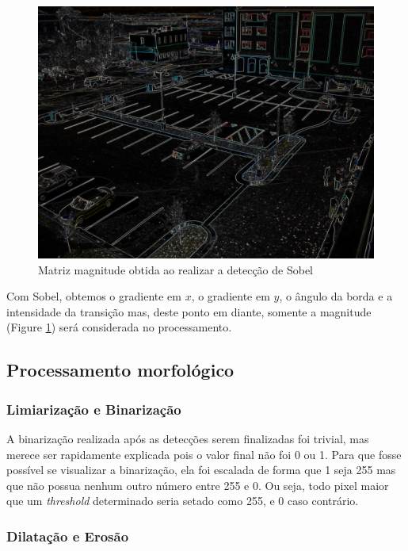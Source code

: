\documentclass[10pt,twocolumn,letterpaper]{article}
\begin{document}
\begin{figure}[!hbp]
\centering
\includegraphics[width=\columnwidth]{sobel-mag.jpg}
\caption{Matriz magnitude obtida ao realizar a detecção de Sobel}
\label{fig:sobel}
\end{figure}

	Com Sobel, obtemos o gradiente em $x$, o gradiente em $y$, o ângulo da borda e a
intensidade da transição mas, deste ponto em diante, somente a magnitude (Figure \ref{fig:sobel}) será considerada
no processamento.

\subsection{Processamento morfológico}

\subsubsection{Limiarização e Binarização}

	A binarização realizada após as detecções serem finalizadas foi trivial, mas merece
ser rapidamente explicada pois o valor final não foi 0 ou 1. Para que fosse possível se
visualizar a binarização, ela foi escalada de forma que 1 seja 255 mas que não possua
nenhum outro número entre 255 e 0. Ou seja, todo pixel maior que um \emph{threshold}
determinado seria setado como 255, e 0 caso contrário.


\subsubsection{Dilatação e Erosão{\footnotesize \cite{filtros-morfologicos}}}
\end{document}
